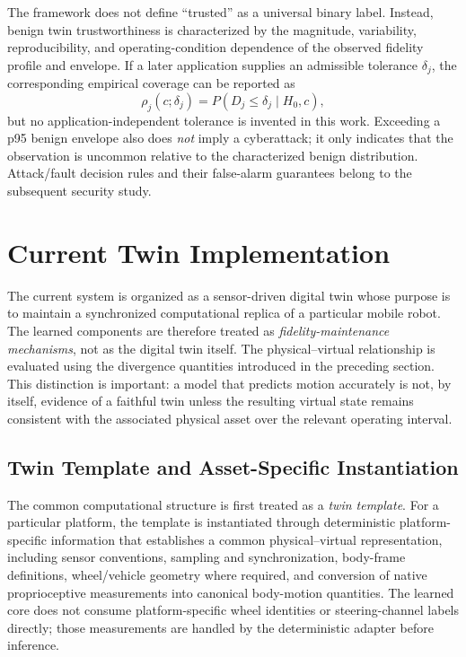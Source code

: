 \documentclass[conference]{IEEEtran}
\begin{document}
The framework does not define ``trusted'' as a universal binary label. Instead, benign twin trustworthiness is characterized by the magnitude, variability, reproducibility, and operating-condition dependence of the observed fidelity profile and envelope. If a later application supplies an admissible tolerance $\delta_j$, the corresponding empirical coverage can be reported as
\begin{equation}
\rho_j(c;\delta_j)=
P\!\left(D_j\le\delta_j\mid H_0,c\right),
\end{equation}
but no application-independent tolerance is invented in this work. Exceeding a p95 benign envelope also does \emph{not} imply a cyberattack; it only indicates that the observation is uncommon relative to the characterized benign distribution. Attack/fault decision rules and their false-alarm guarantees belong to the subsequent security study.

\section{Current Twin Implementation}
\label{sec:implementation}

The current system is organized as a sensor-driven digital twin whose purpose is to maintain a synchronized computational replica of a particular mobile robot. The learned components are therefore treated as \emph{fidelity-maintenance mechanisms}, not as the digital twin itself. The physical--virtual relationship is evaluated using the divergence quantities introduced in the preceding section. This distinction is important: a model that predicts motion accurately is not, by itself, evidence of a faithful twin unless the resulting virtual state remains consistent with the associated physical asset over the relevant operating interval.

\subsection{Twin Template and Asset-Specific Instantiation}
The common computational structure is first treated as a \emph{twin template}. For a particular platform, the template is instantiated through deterministic platform-specific information that establishes a common physical--virtual representation, including sensor conventions, sampling and synchronization, body-frame definitions, wheel/vehicle geometry where required, and conversion of native proprioceptive measurements into canonical body-motion quantities. The learned core does not consume platform-specific wheel identities or steering-channel labels directly; those measurements are handled by the deterministic adapter before inference.
\end{document}
